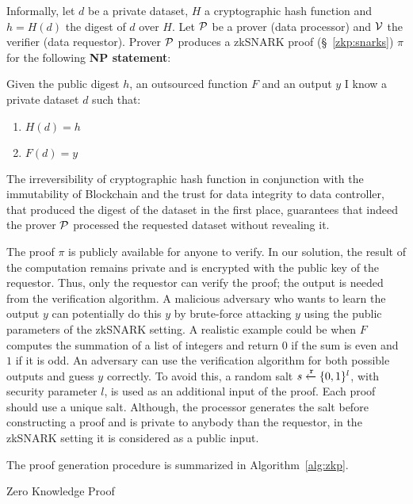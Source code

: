 Informally, let $d$ be a private dataset, $H$ a cryptographic hash function and $h = H(d)$ the digest of $d$ over $H$. Let $\mathcal{P}$ be a prover (data processor) and $\mathcal{V}$ the verifier (data requestor). Prover $\mathcal{P}$ produces a zkSNARK proof (§~\ref{zkp:snarks}) $\pi$ for the following \textbf{NP statement}:

Given the public digest $h$, an outsourced function $F$ and an output $y$ I know a private dataset $d$ such that:
  \begin{enumerate}
    \item $H(d) = h$
    \item $F(d) = y$
  \end{enumerate}

The irreversibility of cryptographic hash function in conjunction with the immutability of Blockchain and the trust for data integrity to data controller, that produced the digest of the dataset in the first place, guarantees that indeed the prover $\mathcal{P}$ processed the requested dataset without revealing it.

The proof $\pi$ is publicly available for anyone to verify. In our solution, the result of the computation remains private and is encrypted with the public key of the requestor. Thus, only the requestor can verify the proof; the output is needed from the verification algorithm. A malicious adversary who wants to learn the output $y$ can potentially do this $y$ by brute-force attacking $y$ using the public parameters of the zkSNARK setting. A realistic example could be when $F$ computes the summation of a list of integers and return $0$ if the sum is even and $1$ if it is odd. An adversary can use the verification algorithm for both possible outputs and guess $y$ correctly. To avoid this, a random salt $s \xleftarrow{\mathtt{r}}{\{0, 1\}^{l}}$, with security parameter $l$, is used as an additional input of the proof. Each proof should use a unique salt. Although, the processor generates the salt before constructing a proof and is private to anybody than the requestor, in the zkSNARK setting it is considered as a public input.

The proof generation procedure is summarized in Algorithm~\ref{alg:zkp}.

\begin{algorithm}[!htb]
  \caption{Zero Knowledge Proof}\label{alg:zkp}
  \begin{algorithmic}[1]
     
     
    \State {} 
  \EndFunction
     
     
  \EndProcedure
  \end{algorithmic}
\end{algorithm}

